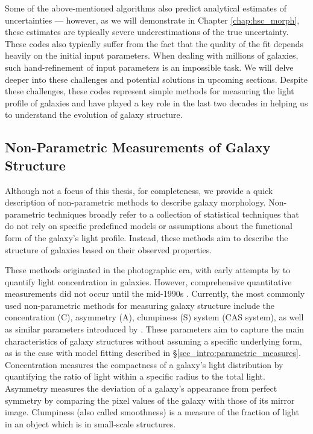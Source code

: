 Some of the above-mentioned algorithms also predict analytical estimates of uncertainties --- however, as we will demonstrate in Chapter \ref{chap:hsc_morph}, these estimates are typically severe underestimations of the true uncertainty. These codes also typically suffer from the fact that the quality of the fit depends heavily on the initial input parameters. When dealing with millions of galaxies, such hand-refinement of input parameters is an impossible task. We will delve deeper into these challenges and potential solutions in upcoming sections. Despite these challenges, these codes represent simple methods for measuring the light profile of galaxies and have played a key role in the last two decades in helping us to understand the evolution of galaxy structure.

\subsection{Non-Parametric Measurements of Galaxy Structure} \label{sec_intro:non_parametric_measures}

Although not a focus of this thesis, for completeness, we provide a quick description of non-parametric methods to describe galaxy morphology. Non-parametric techniques broadly refer to a collection of statistical techniques that do not rely on specific predefined models or assumptions about the functional form of the galaxy's light profile. Instead, these methods aim to describe the structure of galaxies based on their observed properties.

These methods  originated in the photographic era, with early attempts by \citet{morgan_62} to quantify light concentration in galaxies. However, comprehensive quantitative measurements did not occur until the mid-1990s \citep{rix_95,conselice_97}. Currently, the most commonly used non-parametric methods for measuring galaxy structure include the concentration (C), asymmetry (A), clumpiness (S) system (CAS system), as well as similar parameters introduced by \citet{takamiya_99, papovich_03, abraham_03, lotz_04}. These parameters aim to capture the main characteristics of galaxy structures without assuming a specific underlying form, as is the case with model fitting described in \S \ref{sec_intro:parametric_measures}. Concentration measures the compactness of a galaxy's light distribution by quantifying the ratio of light within a specific radius to the total light. Asymmetry measures the deviation of a galaxy's appearance from perfect symmetry by comparing the pixel values of the galaxy with those of its mirror image. Clumpiness (also called smoothness) is a measure of the fraction of light in an object which is in small-scale structures.

